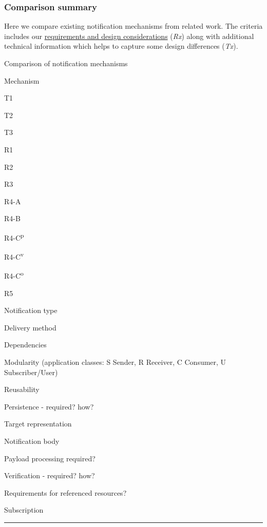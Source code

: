 \documentclass[]{article}
\providecommand{\tightlist}{%
  \setlength{\itemsep}{0pt}\setlength{\parskip}{0pt}}
\begin{document}
\subsubsection{Comparison summary}\label{comparison-summary}

Here we compare existing notification mechanisms from related work. The
criteria includes our
\protect\hyperlink{requirements-and-design-considerations}{requirements
and design considerations} (\emph{Rx}) along with additional technical
information which helps to capture some design differences (\emph{Tx}).

Comparison of notification mechanisms

Mechanism

T1

T2

T3

R1

R2

R3

R4-A

R4-B

R4-C\textsuperscript{p}

R4-C\textsuperscript{v}

R4-C\textsuperscript{o}

R5

\begin{description}
\tightlist
\item[T1]
Notification type
\item[T2]
Delivery method
\item[T3]
Dependencies
\item[R1]
Modularity (application classes: S Sender, R Receiver, C Consumer, U
Subscriber/User)
\item[R2]
Reusability
\item[R3]
Persistence - required? how?
\item[R4-A]
Target representation
\item[R4-B]
Notification body
\item[R4-C\textsuperscript{p}]
Payload processing required?
\item[R4-C\textsuperscript{v}]
Verification - required? how?
\item[R4-C\textsuperscript{o}]
Requirements for referenced resources?
\item[R5]
Subscription
\end{description}

\begin{center}\rule{0.5\linewidth}{\linethickness}\end{center}
\end{document}
